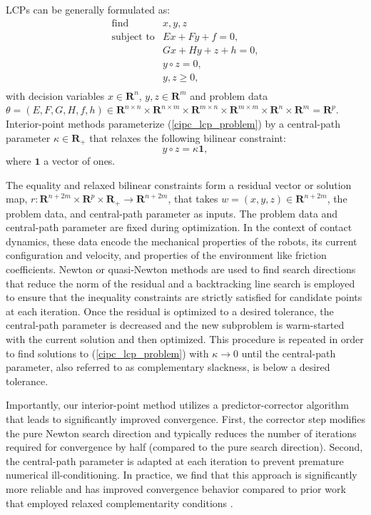LCPs can be generally formulated as:
\begin{equation}
	\begin{array}{ll}
		\mbox{find}       & x, y, z \\
		\mbox{subject to} & E x + F y + f = 0,\\
		& G x + H y + z + h = 0,\\
		& y \circ z = 0,\\
		& y, z \geq 0,\\
	\end{array} \label{cipc_lcp_problem}
\end{equation}
with decision variables $x \in \mathbf{R}^n$, $y, z \in \mathbf{R}^m$ and problem data $\theta = (E, F, G, H, f, h)  \in \mathbf{R}^{n \times n} \times \mathbf{R}^{n \times m} \times \mathbf{R}^{m \times n} \times \mathbf{R}^{m \times m} \times \mathbf{R}^n \times \mathbf{R}^m = \mathbf{R}^p$. Interior-point methods parameterize (\ref{cipc_lcp_problem}) by a  central-path parameter $\kappa \in \mathbf{R}_{+}$ that relaxes the following bilinear constraint:
\begin{equation}
	y \circ z = \kappa \textbf{1},
\end{equation}
where $\textbf{1}$ a vector of ones. 

The equality and relaxed bilinear constraints form a residual vector or solution map, $r: \mathbf{R}^{n + 2m} \times \mathbf{R}^p  \times \mathbf{R}_{+} \rightarrow \mathbf{R}^{n + 2m}$, that takes $w = (x, y, z) \in \mathbf{R}^{n + 2m}$, the problem data, and central-path parameter as inputs. The problem data and central-path parameter are fixed during optimization. In the context of contact dynamics, these data encode the mechanical properties of the robots, its current configuration and velocity, and properties of the environment like friction coefficients.
Newton or quasi-Newton methods are used to find search directions that reduce the norm of the residual and a backtracking line search is employed to ensure that the inequality constraints are strictly satisfied for candidate points at each iteration. Once the residual is optimized to a desired tolerance, the central-path parameter is decreased and the new subproblem is warm-started with the current solution and then optimized. This procedure is repeated in order to find solutions to (\ref{cipc_lcp_problem}) with $\kappa \rightarrow 0$ until the central-path parameter, also referred to as complementary slackness, is below a desired tolerance.

Importantly, our interior-point method utilizes a predictor-corrector algorithm \cite{mehrotra1992implementation} that leads to significantly improved convergence. First, the corrector step modifies the pure Newton search direction and typically reduces the number of iterations required for convergence by half (compared to the pure search direction). Second, the central-path parameter is adapted at each iteration to prevent premature numerical ill-conditioning. In practice, we find that this approach is significantly more reliable and has improved convergence behavior compared to prior work that employed relaxed complementarity conditions \cite{manchester2020variational}.

